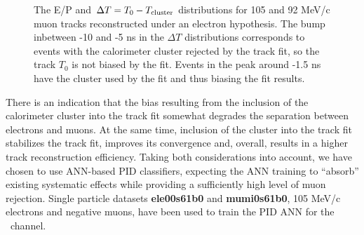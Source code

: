 \begin{figure}[H]
\hspace{-0.6in}
  \caption{
    \label{fig:pid_ep_dt}
    The E/P and $\Delta{T} = T_0 - T_{\rm cluster}$ distributions for 105 and 92 MeV/c muon tracks reconstructed under an
    electron hypothesis. The bump inbetween -10 and -5 ns in the $\Delta{T}$ distributions corresponds
    to events with the calorimeter cluster rejected by the track fit, so the track $T_0$ is not biased by the fit.
    Events in the peak around -1.5 ns have the cluster used by the fit and thus biasing the fit results.
  }
\end{figure}

There is an indication that the bias resulting from the inclusion of the calorimeter cluster
into the track fit somewhat degrades the separation between electrons and muons.
%
At the same time, inclusion of the cluster into the track fit stabilizes the track fit, improves its
convergence and, overall, results in a higher track reconstruction efficiency.
%
Taking both considerations into account, we have chosen to use ANN-based PID classifiers,
expecting the ANN training to ``absorb'' existing systematic effects while providing a sufficiently
high level of muon rejection.
Single particle datasets {\bf ele00s61b0} and {\bf mumi0s61b0},  105 MeV/c electrons and negative muons,
have been used to train the PID ANN for the \MuToEm\ channel.

